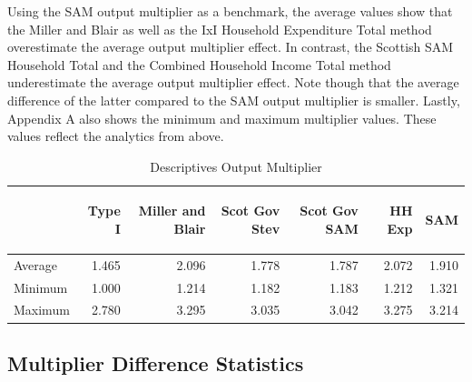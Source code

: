 \begin{doublespacing}
\bigskip

Using the SAM output multiplier as a benchmark, the average values show that the Miller and Blair as well as the IxI Household Expenditure Total method overestimate the average output multiplier effect. In contrast, the Scottish SAM Household Total and the Combined Household Income Total method underestimate the average output multiplier effect. Note though that the average difference of the latter compared to the SAM output multiplier is smaller. Lastly, Appendix A also shows the minimum and maximum multiplier values. These values reflect the analytics from above.


\bigskip
\begin{centering}
  \begin{table}[H]
\centering
  \caption{Descriptives Output Multiplier}
  \bigskip \begin{scriptsize}  \begin{doublespacing}
  \begin{tabular}{lrrrrrr}
  \toprule
   &  \begin{sideways}Type I\end{sideways} & \begin{sideways}Miller and Blair\end{sideways} & \begin{sideways}Scot Gov Stev\end{sideways} & \begin{sideways}Scot Gov SAM\end{sideways} & \begin{sideways}HH Exp\end{sideways} & \begin{sideways}SAM\end{sideways}   \bigstrut[b]\\
  \hline
           Average & 1.465 & 2.096 & 1.778 & 1.787 & 2.072 & 1.910 \\
           Minimum & 1.000 & 1.214 & 1.182 & 1.183 & 1.212 & 1.321 \\
           Maximum & 2.780 & 3.295 & 3.035 & 3.042 & 3.275 & 3.214 \\
  \hline \hline
      \end{tabular}%
        \bigskip  \label{tab:4.5.1}
      \end{doublespacing}  \end{scriptsize} \end{table}
      \end{centering}
\bigskip

\subsection{Multiplier Difference Statistics}
\label{sec:4.5.2}


\end{doublespacing}
